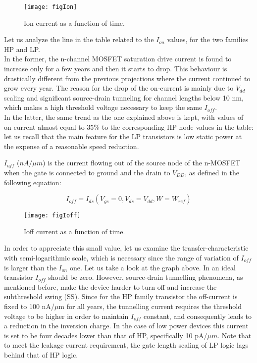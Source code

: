 \documentclass[a4paper, 12pt, twoside, openright]{report}
\begin{document}
	\begin{figure}[h]
	\centering
	\texttt{[image: figIon]}
	\caption{Ion current as a function of time.}
	\label{}
	\end{figure}

Let us analyze the line in the table related to the $I_{on}$ values, for the two families HP and LP. \\In the former, the n-channel MOSFET saturation drive current is found to increase only for a few years and then it starts to drop. This behaviour is drastically different from the previous projections where the current continued to grow every year. The reason for the drop of the on-current is mainly due to $V_{dd}$ scaling and significant source-drain tunneling for channel lengths below 10 nm, which makes a high threshold voltage necessary to keep the same $I_{off}$.\\
In the latter, the same trend as the one explained above is kept, with values of on-current almost equal to 35\% to the corresponding HP-node values in the table: let us recall that the main feature for the LP transistors is low static power at the expense of a reasonable speed reduction.

$I_{off}$ ($nA/\mu m$) is the current flowing out of the source node of the n-MOSFET when the gate is connected to ground and the drain to $V_{DD}$, as defined in the following equation:

\begin{equation}
I_{off} = I_{ds}(V_{gs}=0, V_{ds}=V_{dd}, W=W_{ref})
\label{}
\end{equation}

	\begin{figure}[h]
	\centering
	\texttt{[image: figIoff]}
	\caption{Ioff current as a function of time.}
	\label{}
	\end{figure}

In order to appreciate this small value, let us examine the transfer-characteristic with semi-logarithmic scale, which is necessary since the range of variation of $I_{off}$ is larger than the $I_{on}$ one. Let us take a look at the graph above.
In an ideal transistor $I_{off}$ should be zero. However, source-drain tunnelling phenomena, as mentioned before, make the device harder to turn off and increase the subthreshold swing (SS). Since for the HP family transistor the off-current is fixed to 100 nA/$\mu$m for all years, the tunnelling current requires the threshold voltage to be higher in order to maintain $I_{off}$ constant, and consequently leads to a reduction in the inversion charge.
In the case of low power devices this current is set to be four decades lower than that of HP, specifically 10 pA/$\mu m$. Note that to meet the leakage current requirement, the gate length scaling of LP logic lags behind that of HP logic.
\end{document}
